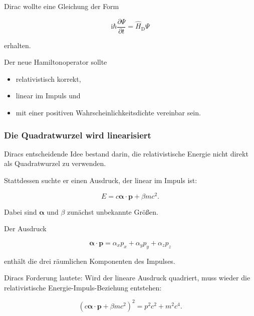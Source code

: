 \begin{DidacticBox}
	\label{box:diracs_forderung_erste_ordnung}
	
	Dirac wollte eine Gleichung der Form
	
	\begin{equation}
		\mathrm{i}\hbar
		\frac{\partial\Psi}{\partial t}
		=
		\hat{H}_{\mathrm D}\Psi
	\end{equation}
	
	erhalten.
	
	Der neue Hamiltonoperator sollte
	
	\begin{itemize}
		\item relativistisch korrekt,
		\item linear im Impuls und
		\item mit einer positiven Wahrscheinlichkeitsdichte vereinbar
		sein.
	\end{itemize}
\end{DidacticBox}

\subsubsection*{Die Quadratwurzel wird linearisiert}

Diracs entscheidende Idee bestand darin, die relativistische Energie
nicht direkt als Quadratwurzel zu verwenden.

Stattdessen suchte er einen Ausdruck, der linear im Impuls ist:

\begin{equation}
	E
	=
	c\boldsymbol{\alpha}\cdot\mathbf{p}
	+
	\beta mc^2.
	\label{eq:linearer_energieansatz_dirac}
\end{equation}

Dabei sind \(\boldsymbol{\alpha}\) und \(\beta\) zunächst unbekannte
Größen.

Der Ausdruck

\begin{equation}
	\boldsymbol{\alpha}\cdot\mathbf{p}
	=
	\alpha_xp_x
	+
	\alpha_yp_y
	+
	\alpha_zp_z
\end{equation}

enthält die drei räumlichen Komponenten des Impulses.

Diracs Forderung lautete: Wird der lineare Ausdruck quadriert, muss
wieder die relativistische Energie-Impuls-Beziehung entstehen:

\begin{equation}
	\left(
	c\boldsymbol{\alpha}\cdot\mathbf{p}
	+
	\beta mc^2
	\right)^2
	=
	p^2c^2
	+
	m^2c^4.
	\label{eq:forderung_quadrat_dirac_ansatz}
\end{equation}

